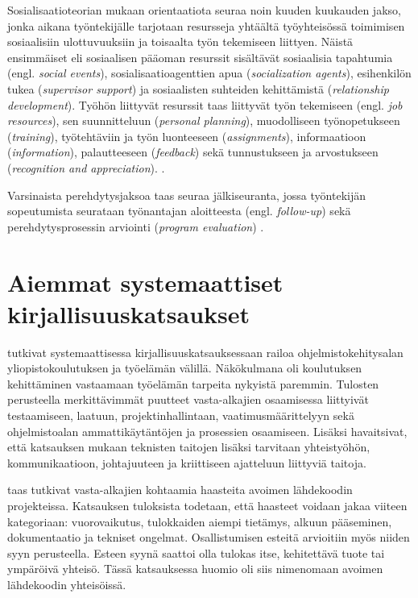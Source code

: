 \documentclass[utf8]{gradu3}
\begin{document}
Sosialisaatioteorian mukaan orientaatiota seuraa noin kuuden kuukauden jakso, jonka aikana työntekijälle tarjotaan resursseja yhtäältä työyhteisössä toimimisen sosiaalisiin ulottuvuuksiin ja toisaalta työn tekemiseen liittyen. Näistä ensimmäiset eli sosiaalisen pääoman resurssit sisältävät sosiaalisia tapahtumia (engl. \textit{social events}), sosialisaatioagenttien apua (\textit{socialization agents}), esihenkilön tukea (\textit{supervisor support}) ja sosiaalisten suhteiden kehittämistä (\textit{relationship development}). Työhön liittyvät resurssit taas liittyvät työn tekemiseen (engl. \textit{job resources}), sen suunnitteluun (\textit{personal planning}), muodolliseen työnopetukseen (\textit{training}), työtehtäviin ja työn luonteeseen (\textit{assignments}), informaatioon (\textit{information}), palautteeseen (\textit{feedback}) sekä tunnustukseen ja arvostukseen (\textit{recognition and appreciation}). \parencite{saks-gruman-2012}.

Varsinaista perehdytysjaksoa taas seuraa jälkiseuranta, jossa työntekijän sopeutumista seurataan työnantajan aloitteesta (engl. \textit{follow-up}) sekä perehdytysprosessin arviointi (\textit{program evaluation}) \parencite{saks-gruman-2012}.



\section{Aiemmat systemaattiset kirjallisuuskatsaukset}

\textcite{garousi-ym-2020} tutkivat systemaattisessa kirjallisuuskatsauksessaan railoa ohjelmistokehitysalan yliopistokoulutuksen ja työelämän välillä. Näkökulmana oli koulutuksen kehittäminen vastaamaan työelämän tarpeita nykyistä paremmin. Tulosten perusteella merkittävimmät puutteet vasta-alkajien osaamisessa liittyivät testaamiseen, laatuun, projektinhallintaan, vaatimusmäärittelyyn sekä ohjelmistoalan ammattikäytäntöjen ja prosessien osaamiseen. Lisäksi \textcite{garousi-ym-2020} havaitsivat, että katsauksen mukaan teknisten taitojen lisäksi tarvitaan yhteistyöhön, kommunikaatioon, johtajuuteen ja kriittiseen ajatteluun liittyviä taitoja. 

\textcite{steinmacher-ym-2015} taas tutkivat vasta-alkajien kohtaamia haasteita avoimen lähdekoodin projekteissa. Katsauksen tuloksista todetaan, että haasteet voidaan jakaa viiteen kategoriaan: vuorovaikutus, tulokkaiden aiempi tietämys, alkuun pääseminen, dokumentaatio ja tekniset ongelmat.  Osallistumisen esteitä arvioitiin myös niiden syyn perusteella. Esteen syynä saattoi olla tulokas itse, kehitettävä tuote tai ympäröivä yhteisö. Tässä katsauksessa huomio oli siis nimenomaan avoimen lähdekoodin yhteisöissä.
\end{document}
